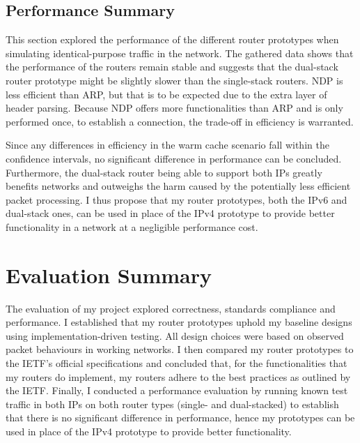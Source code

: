 \subsection{Performance Summary}
\label{sec:4.3.3}

This section explored the performance of the different router prototypes when simulating identical-purpose traffic in the network. The gathered data shows that the performance of the routers remain stable and suggests that the dual-stack router prototype might be slightly slower than the single-stack routers. NDP is less efficient than ARP, but that is to be expected due to the extra layer of header parsing. Because NDP offers more functionalities than ARP and is only performed once, to establish a connection, the trade-off in efficiency is warranted.

Since any differences in efficiency in the warm cache scenario fall within the confidence intervals, no significant difference in performance can be concluded. Furthermore, the dual-stack router being able to support both IPs greatly benefits networks and outweighs the harm caused by the potentially less efficient packet processing. I thus propose that my router prototypes, both the IPv6 and dual-stack ones, can be used in place of the IPv4 prototype to provide better functionality in a network at a negligible performance cost.



\section{Evaluation Summary}

The evaluation of my project explored correctness, standards compliance and performance. I established that my router prototypes uphold my baseline designs using implementation-driven testing. All design choices were based on observed packet behaviours in working networks. I then compared my router prototypes to the IETF's official specifications and concluded that, for the functionalities that my routers do implement, my routers adhere to the best practices as outlined by the IETF. Finally, I conducted a performance evaluation by running known test traffic in both IPs on both router types (single- and dual-stacked) to establish that there is no significant difference in performance, hence my prototypes can be used in place of the IPv4 prototype to provide better functionality.